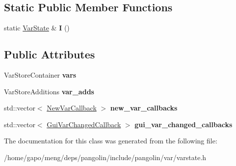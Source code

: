 \subsection*{Static Public Member Functions}
\begin{DoxyCompactItemize}
\item 
static \hyperlink{classpangolin_1_1_var_state}{Var\+State} \& {\bfseries I} ()\hypertarget{classpangolin_1_1_var_state_aa7d02f377798c62f7669b81662acd0bc}{}\label{classpangolin_1_1_var_state_aa7d02f377798c62f7669b81662acd0bc}

\end{DoxyCompactItemize}
\subsection*{Public Attributes}
\begin{DoxyCompactItemize}
\item 
Var\+Store\+Container {\bfseries vars}\hypertarget{classpangolin_1_1_var_state_ac3b9cb32a9c9781e3d9bc8fbdaa8392b}{}\label{classpangolin_1_1_var_state_ac3b9cb32a9c9781e3d9bc8fbdaa8392b}

\item 
Var\+Store\+Additions {\bfseries var\+\_\+adds}\hypertarget{classpangolin_1_1_var_state_a6c13d1b6ae71a520ec272fca48917027}{}\label{classpangolin_1_1_var_state_a6c13d1b6ae71a520ec272fca48917027}

\item 
std\+::vector$<$ \hyperlink{structpangolin_1_1_new_var_callback}{New\+Var\+Callback} $>$ {\bfseries new\+\_\+var\+\_\+callbacks}\hypertarget{classpangolin_1_1_var_state_ac1af07eb2736ca373b344068f9fe702c}{}\label{classpangolin_1_1_var_state_ac1af07eb2736ca373b344068f9fe702c}

\item 
std\+::vector$<$ \hyperlink{structpangolin_1_1_gui_var_changed_callback}{Gui\+Var\+Changed\+Callback} $>$ {\bfseries gui\+\_\+var\+\_\+changed\+\_\+callbacks}\hypertarget{classpangolin_1_1_var_state_ac01d31cc1ea6943fc81cb7f0778070bb}{}\label{classpangolin_1_1_var_state_ac01d31cc1ea6943fc81cb7f0778070bb}

\end{DoxyCompactItemize}


The documentation for this class was generated from the following file\+:\begin{DoxyCompactItemize}
\item 
/home/gapo/meng/deps/pangolin/include/pangolin/var/varstate.\+h\end{DoxyCompactItemize}
